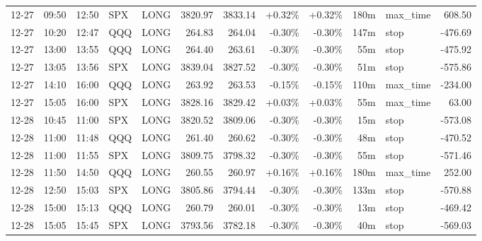 \documentclass[11pt,a4paper,twoside]{article}
\begin{document}
\begin{center}
\begin{longtable}{>{\color{txtmain}}l l l l l r r r r r >{\color{txtmain}}l r}
12-27 & 09:50 & 12:50 & SPX & LONG & 3820.97 & 3833.14 & \textcolor{wingreen}{+0.32\%} & \textcolor{wingreen}{+0.32\%} & 180m & max\_time & \textcolor{wingreen}{608.50} \\
12-27 & 10:20 & 12:47 & QQQ & LONG & 264.83 & 264.04 & \textcolor{lossred}{-0.30\%} & \textcolor{lossred}{-0.30\%} & 147m & stop & \textcolor{lossred}{-476.69} \\
12-27 & 13:00 & 13:55 & QQQ & LONG & 264.40 & 263.61 & \textcolor{lossred}{-0.30\%} & \textcolor{lossred}{-0.30\%} & 55m & stop & \textcolor{lossred}{-475.92} \\
12-27 & 13:05 & 13:56 & SPX & LONG & 3839.04 & 3827.52 & \textcolor{lossred}{-0.30\%} & \textcolor{lossred}{-0.30\%} & 51m & stop & \textcolor{lossred}{-575.86} \\
12-27 & 14:10 & 16:00 & QQQ & LONG & 263.92 & 263.53 & \textcolor{lossred}{-0.15\%} & \textcolor{lossred}{-0.15\%} & 110m & max\_time & \textcolor{lossred}{-234.00} \\
12-27 & 15:05 & 16:00 & SPX & LONG & 3828.16 & 3829.42 & \textcolor{wingreen}{+0.03\%} & \textcolor{wingreen}{+0.03\%} & 55m & max\_time & \textcolor{wingreen}{63.00} \\
12-28 & 10:45 & 11:00 & SPX & LONG & 3820.52 & 3809.06 & \textcolor{lossred}{-0.30\%} & \textcolor{lossred}{-0.30\%} & 15m & stop & \textcolor{lossred}{-573.08} \\
12-28 & 11:00 & 11:48 & QQQ & LONG & 261.40 & 260.62 & \textcolor{lossred}{-0.30\%} & \textcolor{lossred}{-0.30\%} & 48m & stop & \textcolor{lossred}{-470.52} \\
12-28 & 11:00 & 11:55 & SPX & LONG & 3809.75 & 3798.32 & \textcolor{lossred}{-0.30\%} & \textcolor{lossred}{-0.30\%} & 55m & stop & \textcolor{lossred}{-571.46} \\
12-28 & 11:50 & 14:50 & QQQ & LONG & 260.55 & 260.97 & \textcolor{wingreen}{+0.16\%} & \textcolor{wingreen}{+0.16\%} & 180m & max\_time & \textcolor{wingreen}{252.00} \\
12-28 & 12:50 & 15:03 & SPX & LONG & 3805.86 & 3794.44 & \textcolor{lossred}{-0.30\%} & \textcolor{lossred}{-0.30\%} & 133m & stop & \textcolor{lossred}{-570.88} \\
12-28 & 15:00 & 15:13 & QQQ & LONG & 260.79 & 260.01 & \textcolor{lossred}{-0.30\%} & \textcolor{lossred}{-0.30\%} & 13m & stop & \textcolor{lossred}{-469.42} \\
12-28 & 15:05 & 15:45 & SPX & LONG & 3793.56 & 3782.18 & \textcolor{lossred}{-0.30\%} & \textcolor{lossred}{-0.30\%} & 40m & stop & \textcolor{lossred}{-569.03} \\

\end{longtable}
\end{center}
\end{document}
